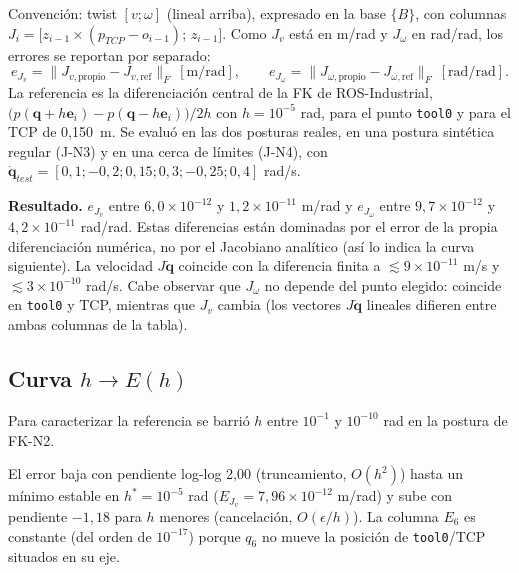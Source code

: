 \documentclass[10pt,a4paper]{article}
\begin{document}
Convención: twist $[v;\omega]$ (lineal arriba), expresado en la base $\{B\}$, con columnas $J_i=\bigl[z_{i-1}\times(p_{TCP}-o_{i-1});\,z_{i-1}\bigr]$. Como $J_v$ está en m/rad y $J_\omega$ en rad/rad, los errores se reportan por separado:
\begin{equation}
e_{J_v}=\lVert J_{v,\mathrm{propio}}-J_{v,\mathrm{ref}}\rVert_F\ [\mathrm{m/rad}],\qquad
e_{J_\omega}=\lVert J_{\omega,\mathrm{propio}}-J_{\omega,\mathrm{ref}}\rVert_F\ [\mathrm{rad/rad}].
\end{equation}
La referencia es la diferenciación central de la FK de ROS-Industrial, $\bigl(p(\mathbf{q}+h\mathbf{e}_i)-p(\mathbf{q}-h\mathbf{e}_i)\bigr)/2h$ con $h=10^{-5}$ rad, para el punto \texttt{tool0} y para el TCP de 0,150~m. Se evaluó en las dos posturas reales, en una postura sintética regular (J-N3) y en una cerca de límites (J-N4), con $\dot{\mathbf{q}}_{test}=[0{,}1;-0{,}2;0{,}15;0{,}3;-0{,}25;0{,}4]$ rad/s.

\begin{landscape}

\end{landscape}
\restoregeometry

\textbf{Resultado.} $e_{J_v}$ entre $6{,}0\times10^{-12}$ y $1{,}2\times10^{-11}$ m/rad y $e_{J_\omega}$ entre $9{,}7\times10^{-12}$ y $4{,}2\times10^{-11}$ rad/rad. Estas diferencias están dominadas por el error de la propia diferenciación numérica, no por el Jacobiano analítico (así lo indica la curva siguiente). La velocidad $J\dot{\mathbf{q}}$ coincide con la diferencia finita a $\lesssim9\times10^{-11}$ m/s y $\lesssim3\times10^{-10}$ rad/s. Cabe observar que $J_\omega$ no depende del punto elegido: coincide en \texttt{tool0} y TCP, mientras que $J_v$ cambia (los vectores $J\dot{\mathbf{q}}$ lineales difieren entre ambas columnas de la tabla).

\subsection{Curva $h\to E(h)$}
Para caracterizar la referencia se barrió $h$ entre $10^{-1}$ y $10^{-10}$ rad en la postura de FK-N2.



El error baja con pendiente log-log 2,00 (truncamiento, $O(h^2)$) hasta un mínimo estable en $h^*=10^{-5}$ rad ($E_{J_v}=7{,}96\times10^{-12}$ m/rad) y sube con pendiente $-1{,}18$ para $h$ menores (cancelación, $O(\epsilon/h)$). La columna $E_6$ es constante (del orden de $10^{-17}$) porque $q_6$ no mueve la posición de \texttt{tool0}/TCP situados en su eje.
\end{document}
